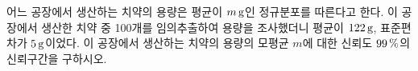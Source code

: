 어느 공장에서 생산하는 치약의 용량은 평균이 $m\mkern3mu \mathrm{g}$인 정규분포를 따른다고 한다. 이 공장에서 생산한 치약 중 100개를 임의추출하여 용량을 조사했더니 평균이 $122\mkern3mu \mathrm{g}$, 표준편차가 $5\mkern3mu \mathrm{g}$이었다. 이 공장에서 생산하는 치약의 용량의 모평균 $m$에 대한 신뢰도 $99\mkern3mu \%$의 신뢰구간을 구하시오. 
